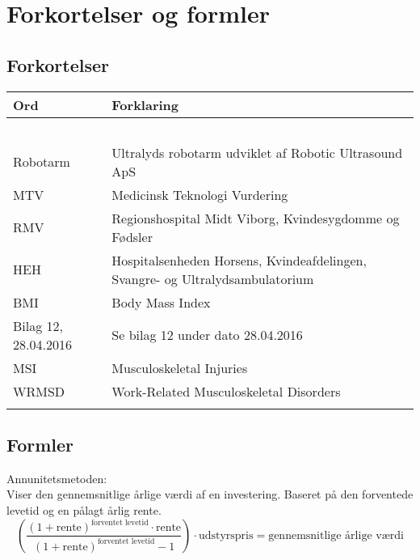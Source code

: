 \chapter{Forkortelser og formler}

\section{Forkortelser}
\begin{longtabu} to 
    Ord &    Forklaring\\
    \toprule\ \\
    Robotarm & Ultralyds robotarm udviklet af Robotic Ultrasound ApS \\
    MTV & Medicinsk Teknologi Vurdering \\
  	RMV & Regionshospital Midt Viborg, Kvindesygdomme og Fødsler \\
  	HEH & Hospitalsenheden Horsens, Kvindeafdelingen, Svangre- og Ultralydsambulatorium \\
  	BMI & Body Mass Index \\
  	Bilag 12, 28.04.2016 & Se bilag 12 under dato 28.04.2016 \\
  	MSI & Musculoskeletal Injuries \\
  	WRMSD & Work-Related Musculoskeletal Disorders \\
   
\label{forkort}
\end{longtabu}

\section{Formler} \label{Formler}
Annunitetsmetoden: \\
Viser den gennemsnitlige årlige værdi af en investering. Baseret på den forventede levetid og en pålagt årlig rente.
\begin{equation}
\left( \dfrac{(1+\text{rente})^{\text{forventet levetid}}\cdot \text{rente}}{(1+\text{rente})^{\text{forventet levetid}}-1}\right)\cdot \text{udstyrspris} = \text{gennemsnitlige årlige værdi}
\end{equation}